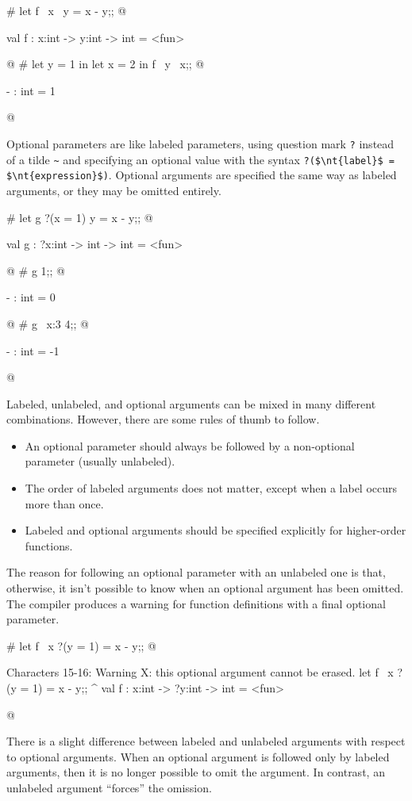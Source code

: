 \begin{ocaml}
# let f ~x ~y = x - y;;
@
\begin{topoutput}
val f : x:int -> y:int -> int = <fun>
\end{topoutput}
@
# let y = 1 in
  let x = 2 in
  f ~y ~x;;
@
\begin{topoutput}
- : int = 1
\end{topoutput}
@
\end{ocaml}
%
\label{keyword:?}
Optional parameters are like labeled parameters, using
question mark \hbox{\lstinline/?/} instead of a tilde \hbox{\lstinline/~/}
and specifying an optional value with the syntax
%
\hbox{\lstinline/?($\nt{label}$ = $\nt{expression}$)/}.
Optional arguments are specified the same way as labeled arguments, or
they may be omitted entirely.

\begin{ocaml}
# let g ?(x = 1) y = x - y;;
@
\begin{topoutput}
val g : ?x:int -> int -> int = <fun>
\end{topoutput}
@
# g 1;;
@
\begin{topoutput}
- : int = 0
\end{topoutput}
@
# g ~x:3 4;;
@
\begin{topoutput}
- : int = -1
\end{topoutput}
@
\end{ocaml}


Labeled, unlabeled, and optional arguments can be mixed in many different combinations.
However, there are some rules of thumb to follow.

\begin{itemize}
\item An optional parameter should always be followed by a non-optional parameter (usually unlabeled).
\item The order of labeled arguments does not matter, except when a label occurs more than once.
\item Labeled and optional arguments should be specified explicitly for higher-order functions.
\end{itemize}
%
The reason for following an optional parameter with an unlabeled one
is that, otherwise, it isn't possible to know when an optional argument has
been omitted.  The compiler produces a warning for function
definitions with a final optional parameter.

\begin{ocaml}
# let f ~x ?(y = 1) = x - y;;
@
\begin{topoutput}
Characters 15-16:
Warning X: this optional argument cannot be erased.
  let f ~x ?(y = 1) = x - y;;
                 ^
val f : x:int -> ?y:int -> int = <fun>
\end{topoutput}
@
\end{ocaml}
%
There is a slight difference between labeled and unlabeled arguments
with respect to optional arguments.  When an optional argument is
followed only by labeled arguments, then it is no longer possible to
omit the argument.  In contrast, an unlabeled argument ``forces'' the
omission.

